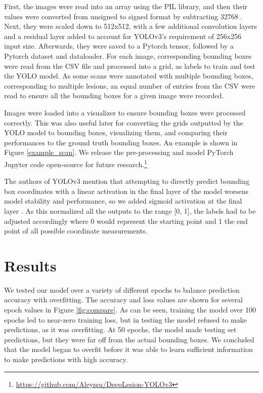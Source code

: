First, the images were read into an array using the PIL library, and then their values were converted from unsigned to signed format by subtracting 32768 \cite{deeplesion}. Next, they were scaled down to 512x512, with a few additional convolution layers and a residual layer added to account for YOLOv3's requirement of 256x256 input size. Afterwards, they were saved to a Pytorch tensor, followed by a Pytorch dataset and dataloader. For each image, corresponding bounding boxes were read from the CSV file and processed into a grid, as labels to train and test the YOLO model. As some scans were annotated with multiple bounding boxes, corresponding to multiple lesions, an equal number of entries from the CSV were read to ensure all the bounding boxes for a given image were recorded.

Images were loaded into a visualizer to ensure bounding boxes were processed correctly. This was also useful later for converting the grids outputted by the YOLO model to bounding boxes, visualizing them, and comparing their performances to the ground truth bounding boxes. An example is shown in Figure \ref{example_scan}. We release the pre-processing and model PyTorch Jupyter code open-source for future research.\footnote{\url{https://github.com/Aleyssu/DeepLesion-YOLOv3}}

The authors of YOLOv3 mention that attempting to directly predict bounding box coordinates with a linear activation in the final layer of the model worsens model stability and performance, so we added sigmoid activation at the final layer \cite{yolov3}. As this normalized all the outputs to the range [0, 1], the labels had to be adjusted accordingly where 0 would represent the starting point and 1 the end point of all possible coordinate measurements.





\section{Results}
We tested our model over a variety of different epochs to balance prediction accuracy with overfitting. The accuracy and loss values are shown for several epoch values in Figure \ref{fig:compare}. As can be seen, training the model over 100 epochs led to near-zero training loss, but in testing the model refused to make predictions, as it was overfitting. At 50 epochs, the model made testing set predictions, but they were far off from the actual bounding boxes. We concluded that the model began to overfit before it was able to learn sufficient information to make predictions with high accuracy.


